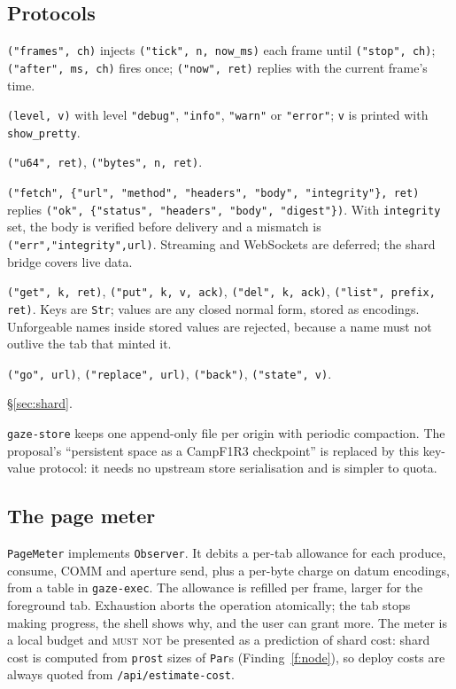 \documentclass[11pt]{article}
\theoremstyle{definition}
\theoremstyle{remark}
\newcommand{\Camp}{CampF1R3}
\newcommand{\MUSTNOT}{\textsc{must not}}
\newcommand{\code}[1]{\texttt{#1}}
\begin{document}
\subsection{Protocols}
\begin{description}[leftmargin=1.5em,style=nextline,itemsep=2pt]
\item[\code{clock}] \code{("frames", ch)} injects \code{("tick", n, now\_ms)} each
  frame until \code{("stop", ch)}; \code{("after", ms, ch)} fires once; \code{("now",
  ret)} replies with the current frame's time.
\item[\code{log}] \code{(level, v)} with level \code{"debug"}, \code{"info"},
  \code{"warn"} or \code{"error"}; \code{v} is printed with \code{show\_pretty}.
\item[\code{rand}] \code{("u64", ret)}, \code{("bytes", n, ret)}.
\item[\code{net}] \code{("fetch", \{"url", "method", "headers", "body",
  "integrity"\}, ret)} replies \code{("ok", \{"status", "headers", "body",
  "digest"\})}. With \code{integrity} set, the body is verified before delivery and a
  mismatch is \code{("err","integrity",url)}. Streaming and WebSockets are deferred;
  the shard bridge covers live data.
\item[\code{store}] \code{("get", k, ret)}, \code{("put", k, v, ack)}, \code{("del", k,
  ack)}, \code{("list", prefix, ret)}. Keys are \code{Str}; values are any closed
  normal form, stored as encodings. Unforgeable names inside stored values are
  rejected, because a name must not outlive the tab that minted it.
\item[\code{nav}] \code{("go", url)}, \code{("replace", url)}, \code{("back")},
  \code{("state", v)}.
\item[\code{shard}] \S\ref{sec:shard}.
\end{description}

\noindent
\code{gaze-store} keeps one append-only file per origin with periodic compaction.
The proposal's ``persistent space as a \Camp{} checkpoint'' is replaced by this
key-value protocol: it needs no upstream store serialisation and is simpler to
quota.

\subsection{The page meter}\label{sec:meter}
\code{PageMeter} implements \code{Observer}. It debits a per-tab allowance for each
produce, consume, COMM and aperture send, plus a per-byte charge on datum
encodings, from a table in \code{gaze-exec}. The allowance is refilled per frame,
larger for the foreground tab. Exhaustion aborts the operation atomically; the tab
stops making progress, the shell shows why, and the user can grant more. The meter
is a local budget and \MUSTNOT{} be presented as a prediction of shard cost:
shard cost is computed from \code{prost} sizes of \code{Par}s
(Finding~\ref{f:node}), so deploy costs are always quoted from
\code{/api/estimate-cost}.
\end{document}
